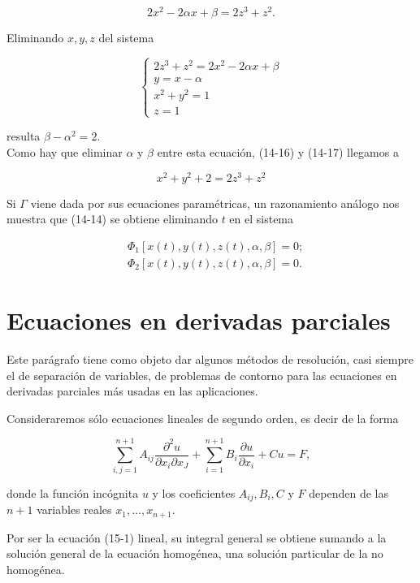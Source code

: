 \documentclass[10pt]{article}
\theoremstyle{plain}
\theoremstyle{definition}
\theoremstyle{remark}
\begin{document}
\begin{equation*}
2 x^{2}-2 \alpha x+\beta=2 z^{3}+z^{2} . \tag{14-17}
\end{equation*}


Eliminando $x, y, z$ del sistema

$$
\left\{\begin{array}{l}
2 z^{3}+z^{2}=2 x^{2}-2 \alpha x+\beta \\
y=x-\alpha \\
x^{2}+y^{2}=1 \\
z=1
\end{array}\right.
$$

resulta $\beta-\alpha^{2}=2$.\\
Como hay que eliminar $\alpha$ y $\beta$ entre esta ecuación, (14-16) y (14-17) llegamos a

$$
x^{2}+y^{2}+2=2 z^{3}+z^{2}
$$

Si $\Gamma$ viene dada por sus ecuaciones paramétricas, un razonamiento análogo nos muestra que (14-14) se obtiene eliminando $t$ en el sistema

$$
\begin{aligned}
& \Phi_{1}[x(t), y(t), z(t), \alpha, \beta]=0 ; \\
& \Phi_{2}[x(t), y(t), z(t), \alpha, \beta]=0 .
\end{aligned}
$$

\section{Ecuaciones en derivadas parciales}
Este parágrafo tiene como objeto dar algunos métodos de resolución, casi siempre el de separación de variables, de problemas de contorno para las ecuaciones en derivadas parciales más usadas en las aplicaciones.

Consideraremos sólo ecuaciones lineales de segundo orden, es decir de la forma


\begin{equation*}
\sum_{i, j=1}^{n+1} A_{i j} \frac{\partial^{2} u}{\partial x_{i} \partial x_{J}}+\sum_{i=1}^{n+1} B_{i} \frac{\partial u}{\partial x_{i}}+C u=F, \tag{15-1}
\end{equation*}


donde la función incógnita $u$ y los coeficientes $A_{i j}, B_{i}, C$ y $F$ dependen de las $n+1$ variables reales $x_{1}, \ldots, x_{n+1}$.

Por ser la ecuación (15-1) lineal, su integral general se obtiene sumando a la solución general de la ecuación homogénea, una solución particular de la no homogénea.
\end{document}
